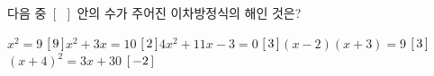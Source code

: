 다음 중 $[\ \ ]$ 안의 수가 주어진 이차방정식의 해인 것은?
\begin{choicesv}{$x^2=9$ \quad $[\mkern3mu 9\mkern3mu ]$}{$x^2+3x=10$ \quad $[\mkern3mu 2\mkern3mu ]$}{$4x^2+11x-3=0$ \quad $[\mkern3mu 3\mkern3mu ]$}{$(x-2)(x+3)=9$ \quad $[\mkern3mu 3\mkern3mu ]$}{$(x+4)^2=3x+30$ \quad $[\mkern3mu -2\mkern3mu ]$}\end{choicesv}
